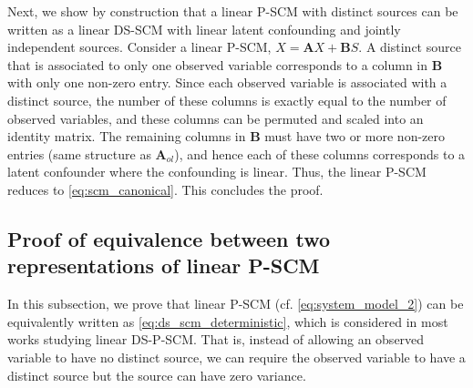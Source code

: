 \documentclass[12pt]{article}
\newcommand{\bA}{\mathbf{A}}
\newcommand{\bB}{\mathbf{B}}
\newcommand{\bI}{\mathbf{I}}
\begin{document}
Next, we show by construction that a linear P-SCM with distinct sources can be written as a linear DS-SCM with linear latent confounding and jointly independent sources. Consider a linear P-SCM, $X = \bA X + \bB S$. A distinct source that is associated to only one observed variable corresponds to a column in $\bB$ with only one non-zero entry. Since each observed variable is associated with a distinct source, the number of these columns is exactly equal to the number of observed variables, and these columns can be permuted and scaled into an identity matrix. The remaining columns in $\bB$ must have two or more non-zero entries (same structure as $\bA_{ol}$), and hence each of these columns corresponds to a latent confounder where the confounding is linear. Thus, the linear P-SCM reduces to \eqref{eq:scm_canonical}. This concludes the proof. 


\subsection{Proof of equivalence between two representations of linear P-SCM} \label{app:proof_equiv_deter}
In this subsection, we prove that linear P-SCM (cf. \eqref{eq:system_model_2}) can be equivalently written as \eqref{eq:ds_scm_deterministic}, which is considered in most works studying linear DS-P-SCM. That is, instead of allowing an observed variable to have no distinct source, we can require the observed variable to have a distinct source but the source can have zero variance.
\end{document}
